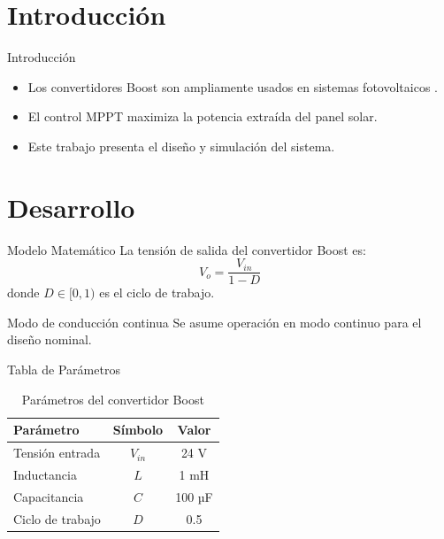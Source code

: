 \section{Introducción}

\begin{frame}{Introducción}
    \begin{itemize}
        \item Los convertidores Boost son ampliamente usados en sistemas fotovoltaicos \cite{mohan2003}.
        \item El control MPPT maximiza la potencia extraída del panel solar.
        \item Este trabajo presenta el diseño y simulación del sistema.
    \end{itemize}
\end{frame}

\section{Desarrollo}

\begin{frame}{Modelo Matemático}
    La tensión de salida del convertidor Boost es:
    \begin{equation}
        V_o = \frac{V_{in}}{1 - D}
    \end{equation}
    donde $D \in [0,1)$ es el ciclo de trabajo.

    \vspace{0.5em}
    \begin{block}{Modo de conducción continua}
        Se asume operación en modo continuo para el diseño nominal.
    \end{block}
\end{frame}

\begin{frame}{Tabla de Parámetros}
    \begin{table}
        \centering
        \begin{tabular}{lcc}
            \toprule
            Parámetro        & Símbolo   & Valor   \\
            \midrule
            Tensión entrada  & $V_{in}$  & 24 V    \\
            Inductancia      & $L$       & 1 mH    \\
            Capacitancia     & $C$       & 100 µF  \\
            Ciclo de trabajo & $D$       & 0.5     \\
            \bottomrule
        \end{tabular}
        \caption{Parámetros del convertidor Boost}
    \end{table}
\end{frame}

